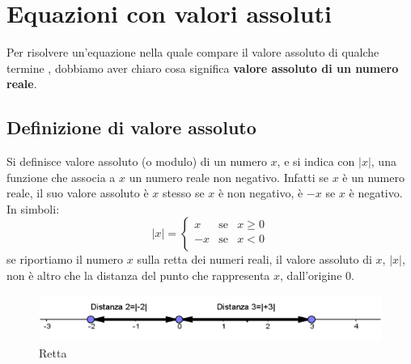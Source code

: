 \section{Equazioni con valori assoluti}
\label{sec:irvalass_valass}

Per risolvere un'equazione nella quale compare il valore assoluto di qualche 
termine , dobbiamo aver chiaro cosa significa \textbf{valore assoluto di un 
numero reale}.

\subsection{Definizione di valore assoluto}

Si definisce valore assoluto (o modulo) di un numero $x$, e si indica con 
$|x|$, 
una funzione che associa a $x$ un numero reale non negativo. Infatti se $x$ è 
un 
numero reale, il suo valore assoluto è $x$ stesso se $x$ è non negativo, è $-x$ 
se $x$ è negativo.\\
In simboli:
$$|x|=\left\lbrace 
\begin{array}{lcl}
x & \text{se} & x\geq 0 \\
-x & \text{se} & x< 0 \\
\end{array}
\right. 
$$
se riportiamo il numero $x$ sulla retta dei numeri reali, il valore assoluto di 
$x$, $|x|$, non è altro che la distanza del punto che rappresenta $x$, 
dall'origine 0.

\begin{figure}[h]
\begin{inaccessibleblock}[TODO]
\centering
\includegraphics[width=0.9\linewidth]{img/imm1} %
\end{inaccessibleblock}
\caption{Retta}
\label{fig:abs_imm1}
\end{figure}

